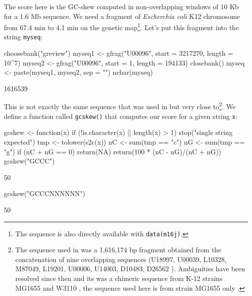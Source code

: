 \documentclass{article}
\begin{document}
The score here is the GC-skew computed in non-overlapping
windows of 10 Kb for a 1.6 Mb sequence.
We need a fragment of \textit{Escherchia coli} K12 chromosome from
67.4 min to 4.1 min on the genetic map\footnote{
The sequence is also directly available with \texttt{data(m16j)}.
}. Let's put this fragment into the string \texttt{myseq}:

\begin{Schunk}
\begin{Sinput}
 choosebank("greview")
 myseq1 <- gfrag("U00096", start = 3217270, length = 10^7)
 myseq2 <- gfrag("U00096", start = 1, length = 194133)
 closebank()
 myseq <- paste(myseq1, myseq2, sep = "")
 nchar(myseq)
\end{Sinput}
\begin{Soutput}
[1] 1616539
\end{Soutput}
\end{Schunk}

This is not exactly the same sequence that was used in \cite{LobryMBE96}
but very close to\footnote{
The sequence used in \cite{LobryMBE96} was a 1,616,174 bp fragment obtained
from the concatenation of nine overlapping sequences
(U18997, U00039, L10328, M87049, L19201, U00006, U14003, D10483, D26562
\cite{SofiaHJ1994, BurlandV1993, DanielsDL1992, PlunkettG1993, BlattnerFR1993, YuraT1992}).
Ambiguities have been resolved since then and its was a chimeric sequence
from K-12 strains MG1655 and W3110 \cite{HayashiK2006}, the sequence used here
is from strain MG1655 only \cite{BlattnerFR1997}. 
}. We define a function called \texttt{gcskew()} that computes our score 
for a given string \texttt{x}:

\begin{Schunk}
\begin{Sinput}
 gcskew <- function(x) {
     if (!is.character(x) || length(x) > 1) 
         stop("single string expected")
     tmp <- tolower(s2c(x))
     nC <- sum(tmp == "c")
     nG <- sum(tmp == "g")
     if (nC + nG == 0) 
         return(NA)
     return(100 * (nC - nG)/(nC + nG))
 }
 gcskew("GCCC")
\end{Sinput}
\begin{Soutput}
[1] 50
\end{Soutput}
\begin{Sinput}
 gcskew("GCCCNNNNNN")
\end{Sinput}
\begin{Soutput}
[1] 50
\end{Soutput}
\end{Schunk}
\end{document}
